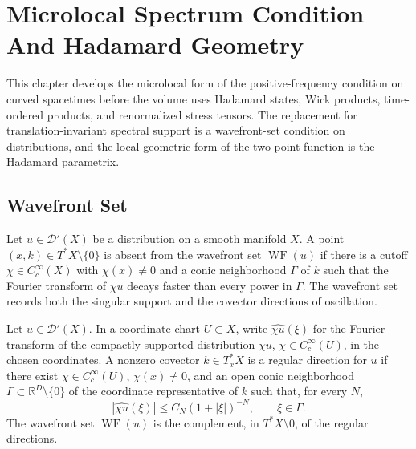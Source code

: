 \chapter{Microlocal Spectrum Condition And Hadamard Geometry}
\label{ch:curved-microlocal-spectrum-condition}

\ConventionsMixed

This chapter develops the microlocal form of the positive-frequency condition
on curved spacetimes before the volume uses Hadamard states, Wick products,
time-ordered products, and renormalized stress tensors.  The replacement for
translation-invariant spectral support is a wavefront-set condition on
distributions, and the local geometric form of the two-point function is the
Hadamard parametrix.

\section{Wavefront Set}

Let \(u\in\mathcal D'(X)\) be a distribution on a smooth manifold \(X\).  A
point \((x,k)\in T^*X\setminus\{0\}\) is absent from the wavefront set
\(\operatorname{WF}(u)\) if there is a cutoff \(\chi\in C_c^\infty(X)\) with
\(\chi(x)\ne0\) and a conic neighborhood \(\Gamma\) of \(k\) such that the
Fourier transform of \(\chi u\) decays faster than every power in \(\Gamma\).
The wavefront set records both the singular support and the covector
directions of oscillation.

\begin{definition}
\label{def:wavefront-set-chart}
Let \(u\in\mathcal D'(X)\).  In a coordinate chart \(U\subset X\), write
\(\widehat{\chi u}(\xi)\) for the Fourier transform of the compactly
supported distribution \(\chi u\), \(\chi\in C_c^\infty(U)\), in the chosen
coordinates.  A nonzero covector \(k\in T_x^*X\) is a regular direction for
\(u\) if there exist \(\chi\in C_c^\infty(U)\), \(\chi(x)\ne0\), and an open
conic neighborhood \(\Gamma\subset\mathbb R^D\setminus\{0\}\) of the
coordinate representative of \(k\) such that, for every \(N\),
\begin{equation}
  |\widehat{\chi u}(\xi)|
  \leq C_N(1+|\xi|)^{-N},
  \qquad
  \xi\in\Gamma .
  \label{eq:microlocal-rapid-decay-direction}
\end{equation}
The wavefront set \(\operatorname{WF}(u)\) is the complement, in
\(T^*X\setminus0\), of the regular directions.
\end{definition}

